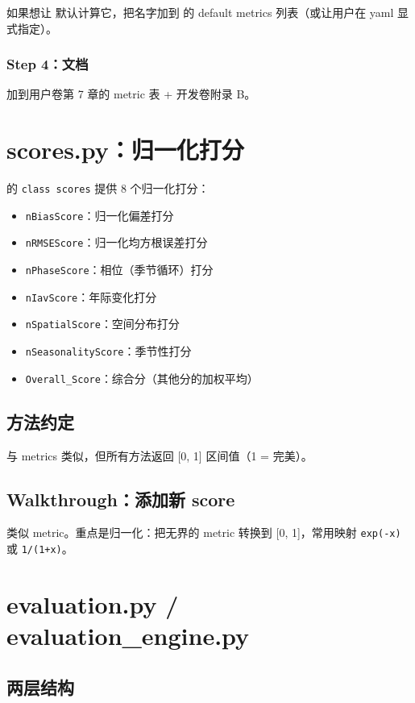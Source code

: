 如果想让  默认计算它，把名字加到  的 default metrics 列表（或让用户在 yaml 显式指定）。

\subsubsection{Step 4：文档}

加到用户卷第 7 章的 metric 表 + 开发卷附录 B。

\section{scores.py：归一化打分}

 的 \texttt{class scores} 提供 8 个归一化打分：

\begin{itemize}
  \item \texttt{nBiasScore}：归一化偏差打分
  \item \texttt{nRMSEScore}：归一化均方根误差打分
  \item \texttt{nPhaseScore}：相位（季节循环）打分
  \item \texttt{nIavScore}：年际变化打分
  \item \texttt{nSpatialScore}：空间分布打分
  \item \texttt{nSeasonalityScore}：季节性打分
  \item \texttt{Overall\_Score}：综合分（其他分的加权平均）
\end{itemize}

\subsection{方法约定}

与 metrics 类似，但所有方法返回 [0, 1] 区间值（1 = 完美）。

\subsection{Walkthrough：添加新 score}

类似 metric。重点是归一化：把无界的 metric 转换到 [0, 1]，常用映射 \texttt{exp(-x)} 或 \texttt{1/(1+x)}。

\section{evaluation.py / evaluation\_engine.py}

\subsection{两层结构}

